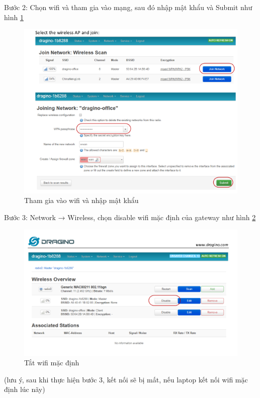 \begin{description}
    \item Bước 2: Chọn wifi và tham gia vào mạng, sau đó nhập mật khẩu và Submit như hình \ref{fig:join_password}
    \begin{figure}[H]
        \includegraphics[width=\textwidth]{images/Quanh/Join_password.png}
        \caption{Tham gia vào wifi và nhập mật khẩu}
        \label{fig:join_password}
    \end{figure}
    \item Bước 3: Network → Wireless, chọn disable wifi mặc định của gateway như hình \ref{fig:disable_wifi}
    \begin{figure}[H]
        \includegraphics[width=\textwidth]{images/Quanh/Disable_wifi.png}
        \caption{Tắt wifi mặc định}
        \label{fig:disable_wifi}
    \end{figure}
\end{description}
(lưu ý, sau khi thực hiện bước 3, kết nối sẽ bị mất, nếu laptop kết nối wifi mặc định lúc nãy)

